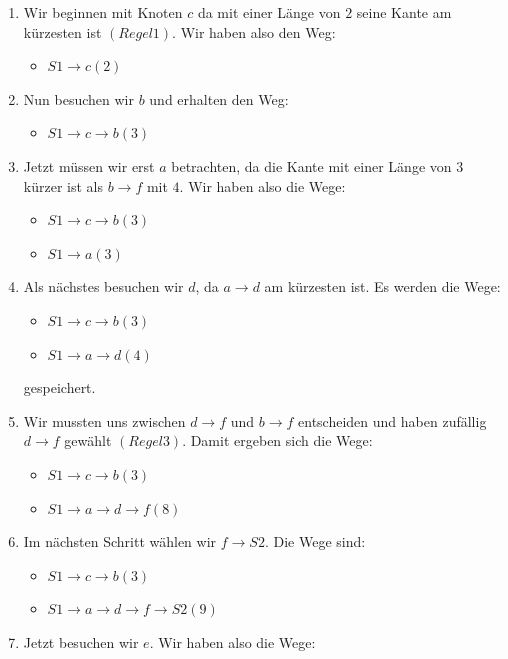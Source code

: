 \begin{enumerate}	\item Wir beginnen mit Knoten $c$ da mit einer L\"ange von $2$ seine Kante am k\"urzesten ist $(Regel 1)$. 
Wir haben also den Weg:
	\begin{itemize}
		\item $S1\rightarrow c(2)$
	\end {itemize}
	\item Nun besuchen wir $b$ und erhalten den Weg:
	\begin{itemize}
		\item $S1\rightarrow c\rightarrow b(3)$
	\end{itemize}
	\item Jetzt m\"ussen wir erst $a$ betrachten, da die Kante mit einer L\"ange von $3$ k\"urzer ist als $b\rightarrow f$ mit $4$. Wir haben also die Wege:
	\begin{itemize}
		\item $S1\rightarrow c\rightarrow b(3)$
		\item $S1\rightarrow a(3)$
	\end{itemize}
	\item Als n\"achstes besuchen wir $d$, da $a\rightarrow d$ am k\"urzesten ist. Es werden die Wege:
	\begin{itemize}
		\item $S1\rightarrow c\rightarrow b(3)$
		\item $S1\rightarrow a\rightarrow d(4)$
	\end{itemize}
	gespeichert.	\item Wir mussten uns zwischen $d\rightarrow f$ und $b\rightarrow f$ entscheiden und haben zuf\"allig $d\rightarrow f$ gew\"ahlt $(Regel 3)$. Damit ergeben sich die Wege:
	\begin{itemize}
		\item $S1\rightarrow c\rightarrow b(3)$
		\item $S1\rightarrow a\rightarrow d\rightarrow f(8)$
	\end{itemize}
	\item Im n\"achsten Schritt w\"ahlen wir $f\rightarrow S2$. Die Wege sind:
	\begin{itemize}
		\item $S1\rightarrow c\rightarrow b(3)$
		\item $S1\rightarrow a\rightarrow d\rightarrow f\rightarrow S2(9)$
	\end{itemize}
	\item Jetzt besuchen wir $e$. Wir haben also die Wege:

\end{enumerate}
